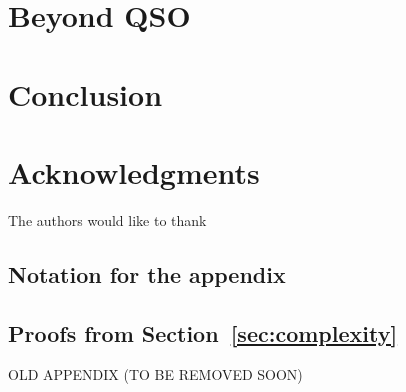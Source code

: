 \documentclass[conference]{IEEEtran}
\begin{document}
\section{Beyond QSO}\label{sec:beyond}


\section{Conclusion}



\section*{Acknowledgments}
The authors would like to thank ~\cite{DrosteG07}






\newpage

\onecolumn
\appendix

\subsection{Notation for the appendix}


\bigskip

\subsection{Proofs from Section~\ref{sec:complexity}}




\newpage

{\LARGE OLD APPENDIX (TO BE REMOVED SOON)}


\end{document}
